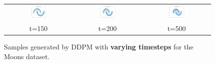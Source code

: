 \documentclass[11pt]{article}
\begin{document}
\begin{figure}[H]
\begin{tabular}{ccc}
        \includegraphics[width=0.3\textwidth]{exps/ddpm_2_150_0.0001_0.02_moons/samples_150.png} &
        \includegraphics[width=0.3\textwidth]{exps/ddpm_2_200_0.0001_0.02_moons/samples_200.png} &
        \includegraphics[width=0.3\textwidth]{exps/ddpm_2_500_0.0001_0.02_moons/samples_500.png} \\
        t=150 & t=200 & t=500 \\
    \end{tabular}
    \caption{Samples generated by DDPM with \textbf{varying timesteps} for the Moons dataset.}
    \label{fig:timesteps_moons}
\end{figure}
\end{document}
